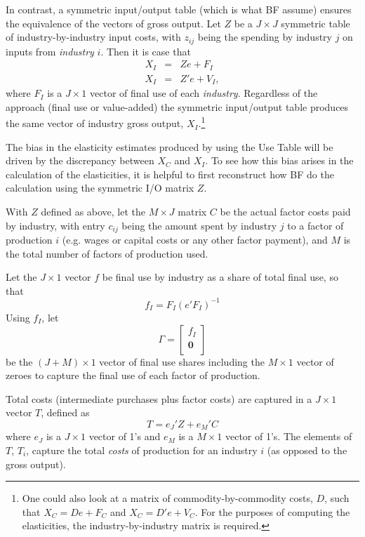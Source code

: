 In contrast, a symmetric input/output table (which is what BF assume) ensures the equivalence of the vectors of gross output. Let $Z$ be a $J \times J$ symmetric table of industry-by-industry input costs, with $z_{ij}$ being the spending by industry $j$ on inputs from \textit{industry} $i$. Then it is case that
\begin{eqnarray}
	X_I &=& Ze + F_I \\
	X_I &=& Z'e + V_I, \label{EQ_TR_Z}
\end{eqnarray}
where $F_I$ is a $J \times 1$ vector of final use of each \textit{industry}. Regardless of the approach (final use or value-added) the symmetric input/output table produces the same vector of industry gross output, $X_I$.\footnote{One could also look at a matrix of commodity-by-commodity costs, $D$, such that $X_C = De + F_C$ and $X_C = D'e + V_C$. For the purposes of computing the elasticities, the industry-by-industry matrix is required.}

The bias in the elasticity estimates produced by using the Use Table will be driven by the discrepancy between $X_C$ and $X_I$. To see how this bias arises in the calculation of the elasticities, it is helpful to first reconstruct how BF do the calculation using the symmetric I/O matrix $Z$.  

With $Z$ defined as above, let the $M \times J$ matrix $C$ be the actual factor costs paid by industry, with entry $c_{ij}$ being the amount spent by industry $j$ to a factor of production $i$ (e.g. wages or capital costs or any other factor payment), and $M$ is the total number of factors of production used. 

Let the $J \times 1$ vector $f$ be final use by industry as a share of total final use, so that
\begin{equation*}
	f_I = F_I (e'F_I)^{-1}
\end{equation*}
Using $f_I$, let 
\begin{equation*}
	\Gamma = \begin{bmatrix}
		f_I  \\
		\mathbf{0}  \\
	\end{bmatrix}
\end{equation*}
be the $(J+M) \times 1$ vector of final use shares including the $M \times 1$ vector of zeroes to capture the final use of each factor of production.

Total costs (intermediate purchases plus factor costs) are captured in a $J\times 1$ vector $T$, defined as
\begin{equation*}
	T = e_J'Z + e_M'C
\end{equation*}
where $e_J$ is a $J\times 1$ vector of 1's and $e_M$ is a $M\times 1$ vector of 1's. The elements of $T$, $T_i$, capture the total \textit{costs} of production for an industry $i$ (as opposed to the gross output).

